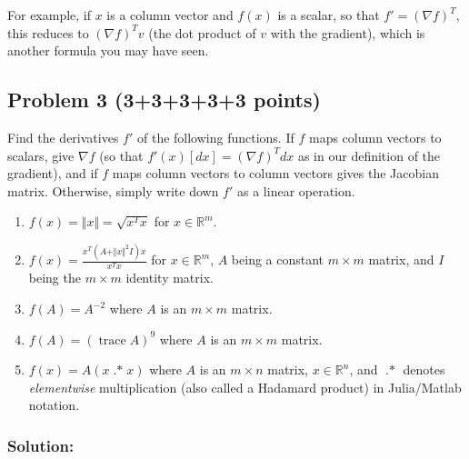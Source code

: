\documentclass[10pt,oneside]{article}
\newcommand{\tr}{\operatorname{trace}}
\newcommand{\dotstar}{\operatorname{.*}}
\begin{document}
For example, if $x$ is a column vector and $f(x)$ is a scalar, so that $f' = (\nabla f)^T$, this reduces to $(\nabla f)^T v$ (the dot product of $v$ with the gradient), which is another formula you may have seen.

\subsection*{Problem 3 (3+3+3+3+3 points)}

Find the derivatives $f'$ of the following functions.  If $f$ maps column vectors to scalars, give $\nabla f$ (so that $f'(x)[dx] = (\nabla f)^T dx$ as in our definition of the gradient), and if $f$ maps column vectors to column vectors gives the Jacobian matrix.  Otherwise, simply write down $f'$ as a linear operation.

\begin{enumerate}

\item $f(x) = \Vert x \Vert = \sqrt{x^T x}$ for $x \in \mathbb{R}^m$.

\item $f(x) = \frac{x^T (A + \Vert x \Vert^2 I) x}{x^T x}$ for $x \in \mathbb{R}^m$, $A$ being a constant $m \times m$ matrix, and $I$ being the $m \times m$ identity matrix.

\item $f(A) = A^{-2}$ where $A$ is an $m \times m$ matrix.

\item $f(A) = (\tr A)^9$ where $A$ is an $m \times m$ matrix.

\item $f(x) = A (x \dotstar x)$ where $A$ is an $m \times n$ matrix, $x \in \mathbb{R}^n$, and $\dotstar$ denotes \emph{elementwise} multiplication (also called a Hadamard product) in Julia/Matlab notation. 

\end{enumerate}

\subsubsection*{Solution:}
\end{document}
